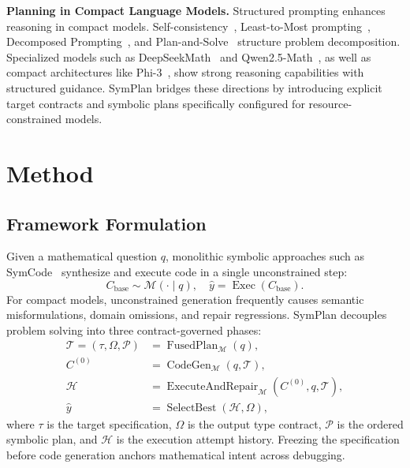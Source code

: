 \documentclass[conference,a4paper]{IEEEtran}
\begin{document}
\textbf{Planning in Compact Language Models.} Structured prompting enhances reasoning in compact models. Self-consistency~\cite{wang2023selfconsistency}, Least-to-Most prompting~\cite{zhou2023leasttomost}, Decomposed Prompting~\cite{khot2023decomposed}, and Plan-and-Solve~\cite{wang2023plan} structure problem decomposition. Specialized models such as DeepSeekMath~\cite{shao2024deepseekmath} and Qwen2.5-Math~\cite{yang2024qwen25math}, as well as compact architectures like Phi-3~\cite{abdin2024phi3}, show strong reasoning capabilities with structured guidance. SymPlan bridges these directions by introducing explicit target contracts and symbolic plans specifically configured for resource-constrained models.

\section{Method}
\label{sec:method}

\subsection{Framework Formulation}

Given a mathematical question $q$, monolithic symbolic approaches such as SymCode~\cite{nezhad2025symcode} synthesize and execute code in a single unconstrained step:
\begin{equation}
C_{\text{base}} \sim \mathcal{M}(\cdot \mid q), \quad \hat{y} = \operatorname{Exec}(C_{\text{base}}).
\label{eq:monolithic}
\end{equation}
For compact models, unconstrained generation frequently causes semantic misformulations, domain omissions, and repair regressions. SymPlan decouples problem solving into three contract-governed phases:
\begin{align}
\mathcal{T} = (\tau, \Omega, \mathcal{P}) &= \operatorname{FusedPlan}_{\mathcal{M}}(q), \label{eq:fused_plan} \\
C^{(0)} &= \operatorname{CodeGen}_{\mathcal{M}}(q, \mathcal{T}), \label{eq:codegen} \\
\mathcal{H} &= \operatorname{ExecuteAndRepair}_{\mathcal{M}}(C^{(0)}, q, \mathcal{T}), \label{eq:repair} \\
\hat{y} &= \operatorname{SelectBest}(\mathcal{H}, \Omega), \label{eq:select}
\end{align}
where $\tau$ is the target specification, $\Omega$ is the output type contract, $\mathcal{P}$ is the ordered symbolic plan, and $\mathcal{H}$ is the execution attempt history. Freezing the specification before code generation anchors mathematical intent across debugging.
\end{document}
